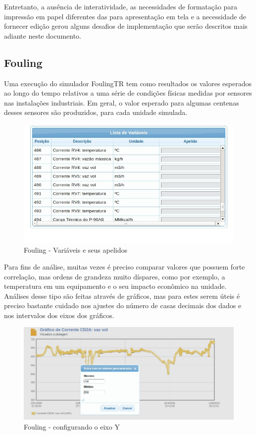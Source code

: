 \documentclass[]{article}
\begin{document}
Entretanto, a ausência de interatividade, as necessidades de formatação para impressão em papel diferentes das para apresentação em tela e a necessidade de fornecer edição gerou alguns desafios de implementação que serão descritos mais adiante neste documento.

\subsection{Fouling}

Uma execução do simulador FoulingTR tem como resultados os valores esperados ao longo do tempo relativos a uma série de condições físicas medidas por sensores nas instalações industriais. Em geral, o valor esperado para algumas centenas desses sensores são produzidos, para cada unidade simulada.

\begin{figure}[!ht]
\centering
\includegraphics[scale=.7]{./fouling_apelidos}
\caption{Fouling - Variáveis e seus apelidos}
\label{fig:fouling_apelidos}
\end{figure}


Para fins de análise, muitas vezes é preciso comparar valores que possuem forte correlação, mas ordens de grandeza muito díspares, como por exemplo, a temperatura em um equipamento e o seu impacto econômico na unidade. Análises desse tipo são feitas através de gráficos, mas para estes serem úteis é preciso bastante cuidado nos ajustes do número de casas decimais dos dados e nos intervalos dos eixos dos gráficos.

\begin{figure}[!ht]
\centering
\includegraphics[scale=0.5]{./fouling_intervaloY}
\caption{Fouling - configurando o eixo Y}
\label{fig:fouling_intervaloY}
\end{figure}
\end{document}
